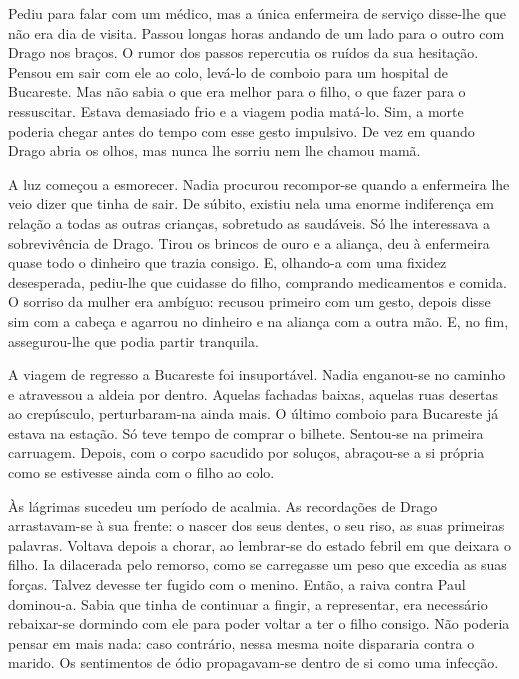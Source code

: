 Pediu para falar com um médico, mas a única enfermeira de serviço
disse-lhe que não era dia de visita. Passou longas horas andando de um
lado para o outro com Drago nos braços. O rumor dos passos repercutia os
ruídos da sua hesitação. Pensou em sair com ele ao colo, levá-lo de
comboio para um hospital de Bucareste. Mas não sabia o que era melhor
para o filho, o que fazer para o ressuscitar. Estava demasiado frio e a
viagem podia matá-lo. Sim, a morte poderia chegar antes do tempo com
esse gesto impulsivo. De vez em quando Drago abria os olhos, mas nunca
lhe sorriu nem lhe chamou mamã.

A luz começou a esmorecer. Nadia procurou recompor-se quando a enfermeira lhe veio dizer que tinha de sair. De súbito,
existiu nela uma enorme indiferença em relação a todas as outras
crianças, sobretudo as saudáveis. Só
lhe interessava a sobrevivência de Drago. Tirou os brincos de ouro e a
aliança, deu à enfermeira quase todo o dinheiro que trazia consigo. E,
olhando-a com uma fixidez desesperada, pediu-lhe que cuidasse do
filho, comprando medicamentos e comida. O sorriso da mulher era
ambíguo: recusou primeiro com um gesto, depois disse sim com a cabeça e
agarrou no dinheiro e na aliança com a outra mão. E, no fim,
assegurou-lhe que podia partir tranquila.

A viagem de regresso a Bucareste foi insuportável. Nadia enganou-se no
caminho e atravessou a aldeia por dentro. Aquelas fachadas baixas,
aquelas ruas desertas ao crepúsculo, perturbaram-na ainda mais. O último
comboio para Bucareste já estava na estação. Só teve tempo de comprar
o bilhete. Sentou-se na primeira carruagem. Depois, com o corpo sacudido
por soluços, abraçou-se a si própria como se estivesse ainda com o filho
ao colo.

Às lágrimas sucedeu um período de acalmia. As recordações de Drago
arrastavam-se à sua frente: o nascer dos seus dentes, o seu riso, as
suas primeiras palavras. Voltava depois a chorar, ao lembrar-se do
estado febril em que deixara o filho. Ia dilacerada pelo remorso, como
se carregasse um peso que excedia as suas forças. Talvez devesse ter
fugido com o menino. Então, a raiva contra Paul dominou-a. Sabia que
tinha de continuar a fingir, a representar, era necessário rebaixar-se
dormindo com ele para poder voltar a ter o filho consigo. Não poderia
pensar em mais nada: caso contrário, nessa mesma noite dispararia contra
o marido. Os sentimentos de ódio propagavam-se dentro de si como uma
infecção.

